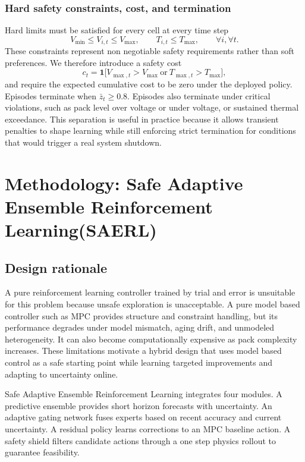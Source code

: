 \documentclass[%
 aip,
 amsmath,amssymb,
reprint, onecolumn %
]{revtex4-1}
\begin{document}
\subsubsection{Hard safety constraints, cost, and termination}
Hard limits must be satisfied for every cell at every time step
\begin{equation}
V_{\min} \le V_{i,t} \le V_{\max},
\qquad
T_{i,t} \le T_{\max},
\qquad
\forall i,\forall t.
\end{equation}
These constraints represent non negotiable safety requirements rather than soft preferences. We therefore introduce a safety cost
\begin{equation}
c_t = \mathbf{1}\!\Big[V_{\max,t} > V_{\max}\ \mathrm{or}\ T_{\max,t} > T_{\max}\Big],
\end{equation}
and require the expected cumulative cost to be zero under the deployed policy. Episodes terminate when $\bar z_t \ge 0.8$. Episodes also terminate under critical violations, such as pack level over voltage or under voltage, or sustained thermal exceedance. This separation is useful in practice because it allows transient penalties to shape learning while still enforcing strict termination for conditions that would trigger a real system shutdown.

\section{Methodology: Safe Adaptive Ensemble Reinforcement Learning(SAERL)}

\subsection{Design rationale}
A pure reinforcement learning controller trained by trial and error is unsuitable for this problem because unsafe exploration is unacceptable. A pure model based controller such as MPC provides structure and constraint handling, but its performance degrades under model mismatch, aging drift, and unmodeled heterogeneity. It can also become computationally expensive as pack complexity increases. These limitations motivate a hybrid design that uses model based control as a safe starting point while learning targeted improvements and adapting to uncertainty online.

Safe Adaptive Ensemble Reinforcement Learning integrates four modules. A predictive ensemble provides short horizon forecasts with uncertainty. An adaptive gating network fuses experts based on recent accuracy and current uncertainty. A residual policy learns corrections to an MPC baseline action. A safety shield filters candidate actions through a one step physics rollout to guarantee feasibility.
\end{document}
